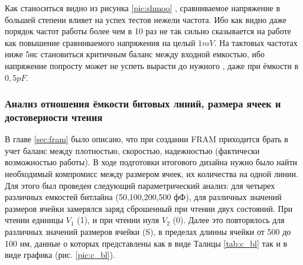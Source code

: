 \documentclass[a4paper,12pt]{article} %
\begin{document}
Как станоситься видно из рисунка \ref{pic:shmoo} , сравниваемое напряжение в большей  степени влияет на успех тестов нежели частота. Ибо как видно даже порядок частот работы более чем в 10 раз не так сильно сказывается на работе как повышение сравниваемого напряжения на целый $1 mV $. На тактовых частотах ниже 5нс становиться критичным баланс между входной емкостью, ибо напряжение попросту может не успеть вырасти до нужного , даже при ёмкости в  $0,5 pF $. 

\subsubsection{Анализ отношения ёмкости битовых линий, размера ячеек и достоверности чтения}
\label{subsec:c_bl}
В главе \ref{sec:fram} было описано, что при создании FRAM  приходится брать в учет баланс между плотностью, скоростью, надежностью (фактически возможностью работы). В ходе подготовки итогового дизайна нужно было найти необходимый компромисс между размером ячеек, их количества на одной линии. Для этого был проведен следующий параметрический анализ: для четырех различных емкостей битлайна (50,100,200,500 фФ), для различных значений размеров ячейки замерялся заряд сброшенный при чтении двух состояний. При чтении единицы $V_1$ (1), и при чтении нуля $V_2$ (0). Далее это повторялось для различных значений размеров ячейки (S), в пределах длинны ячейки от 500 до 100 нм, данные о которых представлены как в виде Талицы \ref{tab:c_bl} так и в виде графика (рис. \ref{pic:c_bl}).
\end{document}
